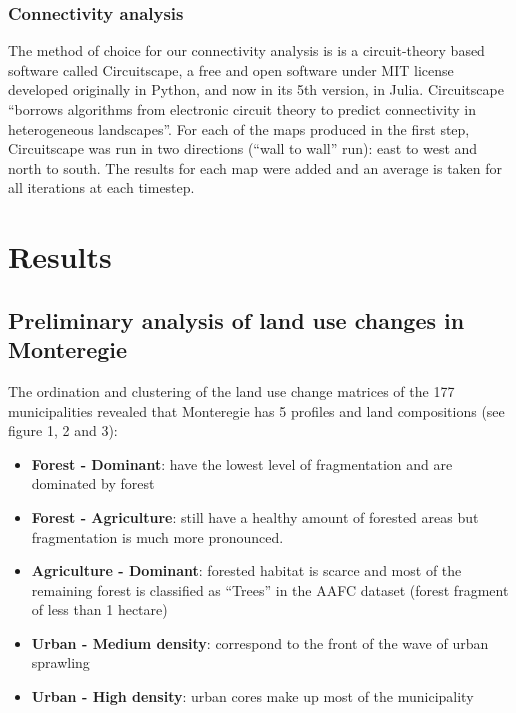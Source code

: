 \subsubsection{Connectivity analysis}
The method of choice for our connectivity analysis is is a circuit-theory based software called Circuitscape, a free and open software under MIT license developed originally in Python, and now in its 5th version, in Julia.  Circuitscape “borrows algorithms from electronic circuit theory to predict connectivity in heterogeneous landscapes”.
For each of the maps produced in the first step, Circuitscape was run in two directions (“wall to wall” run): east to west and north to south. The results for each map were added and an average is taken for all iterations at each timestep.\\


\section{Results}

\subsection{Preliminary analysis of land use changes in Monteregie}
The ordination and clustering of the land use change matrices of the 177 municipalities revealed that Monteregie has 5 profiles and land compositions (see figure 1, 2 and 3):
\begin{itemize}
  \item \textbf{Forest - Dominant}: have the lowest level of fragmentation and are dominated by forest
  \item \textbf{Forest - Agriculture}: still have a healthy amount of forested areas but fragmentation is much more pronounced.
  \item \textbf{Agriculture - Dominant}: forested habitat is scarce and most of the remaining forest is classified as “Trees” in the AAFC dataset (forest fragment of less than 1 hectare)
  \item \textbf{Urban - Medium density}: correspond to the front of the wave of urban sprawling
  \item \textbf{Urban - High density}: urban cores make up most of the municipality
\end{itemize}

